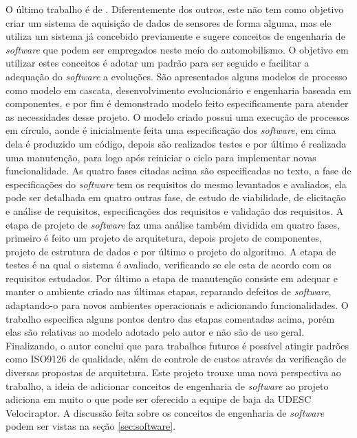 O último trabalho é de . Diferentemente dos outros, este não tem como objetivo criar um sistema de aquisição de dados de sensores de forma alguma, mas ele utiliza um sistema já concebido previamente e sugere conceitos de engenharia de \textit{software} que podem ser empregados neste meio do automobilismo. O objetivo em utilizar estes conceitos é adotar um padrão para ser seguido e facilitar a adequação do \textit{software} a evoluções. São apresentados alguns modelos de processo como modelo em cascata, desenvolvimento evolucionário e engenharia baseada em componentes, e por fim é demonstrado modelo feito especificamente para atender as necessidades desse projeto. O modelo criado possui uma execução de processos em círculo, aonde é inicialmente feita uma especificação dos \textit{software}, em cima dela é produzido um código, depois são realizados testes e por último é realizada uma manutenção, para logo após reiniciar o ciclo para implementar novas funcionalidade. As quatro fases citadas acima são especificadas no texto, a fase de especificações do \textit{software} tem os requisitos do mesmo levantados e avaliados, ela pode ser detalhada em quatro outras fase, de estudo de viabilidade, de elicitação e análise de requisitos, especificações dos requisitos e validação dos requisitos. A etapa de projeto de \textit{software} faz uma análise também dividida em quatro fases, primeiro é feito um projeto de arquitetura, depois projeto de componentes, projeto de estrutura de dados e por último o projeto do algoritmo. A etapa de testes é na qual o sistema é avaliado, verificando se ele esta de acordo com os requisitos estudados. Por último a etapa de manutenção consiste em adequar e manter o ambiente criado nas últimas etapas, reparando defeitos de \textit{software}, adaptando-o para novos ambientes operacionais e adicionando funcionalidades. O trabalho especifica alguns pontos dentro das etapas comentadas acima, porém elas são relativas ao modelo adotado pelo autor e não são de uso geral. Finalizando, o autor conclui que para trabalhos futuros é possível atingir padrões como ISO9126 de qualidade, além de controle de custos através da verificação de diversas propostas de arquitetura. Este projeto trouxe uma nova perspectiva ao trabalho, a ideia de adicionar conceitos de engenharia de \textit{software} ao projeto adiciona em muito o que pode ser oferecido a equipe de baja da UDESC Velociraptor. A discussão feita sobre os conceitos de engenharia de \textit{software} podem ser vistas na seção \ref{sec:software}. 
